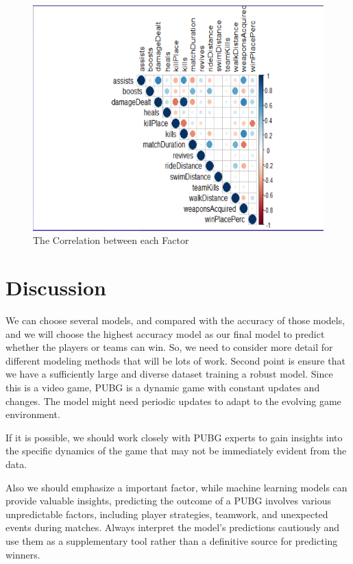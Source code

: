 \documentclass[12pt]{article}
\begin{document}
\begin{figure}[tbp]
	\centering
	\includegraphics[width=\textwidth]{Correlation.png}
	\caption{The Correlation between each Factor}
	\label{fig:Correlation}
\end{figure}


\section{Discussion}
\label{sec:disc}

We can choose several models, and compared with the accuracy of those models, and we will choose the highest accuracy model as our final model to predict whether the players or teams can win. So, we need to consider more detail for different modeling methods that will be lots of work.
Second point is ensure that we have a sufficiently large and diverse dataset training a robust model.
Since this is a video game, PUBG is a dynamic game with constant updates and changes. The model might need periodic updates to adapt to the evolving game environment.

If it is possible, we should work closely with PUBG experts to gain insights into the specific dynamics of the game that may not be immediately evident from the data.

Also we should emphasize a important factor, while machine learning models can provide valuable insights, predicting the outcome of a PUBG  involves various unpredictable factors, including player strategies, teamwork, and unexpected events during matches. Always interpret the model's predictions cautiously and use them as a supplementary tool rather than a definitive source for predicting winners.






\end{document}
